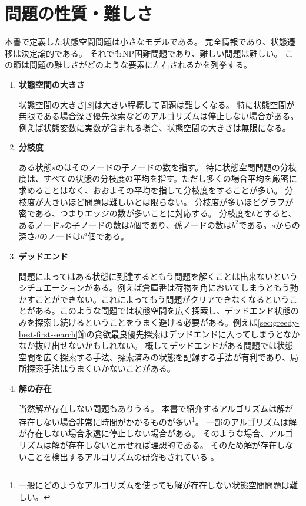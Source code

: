\section{問題の性質・難しさ}
\label{sec:difficulity}

本書で定義した状態空間問題は小さなモデルである。
完全情報であり、状態遷移は決定論的である。
それでもNP困難問題であり、難しい問題は難しい。
この節は問題の難しさがどのような要素に左右されるかを列挙する。

\begin{enumerate}
\item {\bf 状態空間の大きさ}

状態空間の大きさ$|S|$は大きい程概して問題は難しくなる。
特に状態空間が無限である場合深さ優先探索などのアルゴリズムは停止しない場合がある。
例えば状態変数に実数が含まれる場合、状態空間の大きさは無限になる。

\item {\bf 分枝度}

ある状態$s$のはそのノードの子ノードの数を指す。
特に状態空間問題の分枝度は、すべての状態の分枝度の平均を指す。ただし多くの場合平均を厳密に求めることはなく、おおよその平均を指して分枝度をすることが多い。
分枝度が大きいほど問題は難しいとは限らない。
分枝度が多いほどグラフが密である、つまりエッジの数が多いことに対応する。
分枝度を$b$とすると、あるノード$s$の子ノードの数は$b$個であり、孫ノードの数は$b^2$である。$s$からの深さ$d$のノードは$b^d$個である。

\item {\bf デッドエンド}

問題によってはある状態に到達するともう問題を解くことは出来ないというシチュエーションがある。例えば倉庫番は荷物を角においてしまうともう動かすことができない。これによってもう問題がクリアできなくなるということがある。このような問題では状態空間を広く探索し、デッドエンド状態のみを探索し続けるということをうまく避ける必要がある。例えば\ref{sec:greedy-best-first-search}節の貪欲最良優先探索はデッドエンドに入ってしまうとなかなか抜け出せないかもしれない。
概してデッドエンドがある問題では状態空間を広く探索する手法、探索済みの状態を記録する手法が有利であり、局所探索手法はうまくいかないことがある。

\item {\bf 解の存在}

当然解が存在しない問題もありうる。
本書で紹介するアルゴリズムは解が存在しない場合非常に時間がかかるものが多い\footnote{一般にどのようなアルゴリズムを使っても解が存在しない状態空間問題は難しい。}。
一部のアルゴリズムは解が存在しない場合永遠に停止しない場合がある。
そのような場合、アルゴリズムは解が存在しないと示せれば理想的である。
そのため解が存在しないことを検出するアルゴリズムの研究もされている \cite{backstrom2013fast,hoffmann2014distance}。

\end{enumerate}


